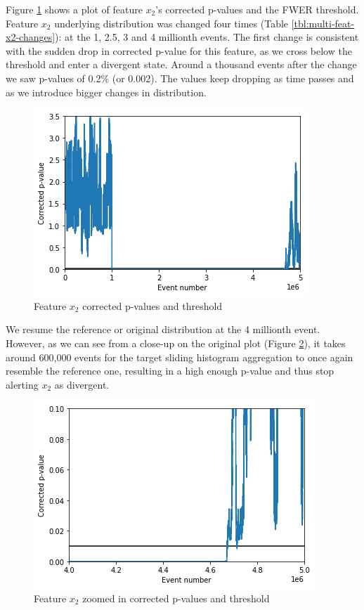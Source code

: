 \documentclass[sigconf]{acmart}
\begin{document}
Figure \ref{fig:x2-corrected-pvalues} shows a plot of feature $x_2$'s corrected p-values and the FWER threshold. Feature $x_2$ underlying distribution was changed four times (Table \ref{tbl:multi-feat-x2-changes}): at the 1, 2.5, 3 and 4 millionth events. The first change is consistent with the sudden drop in corrected p-value for this feature, as we cross below the threshold and enter a divergent state. Around a thousand events after the change we saw p-values of 0.2\% (or 0.002). The values keep dropping as time passes and as we introduce bigger changes in distribution.
\begin{figure}[!htb]
    \begin{center}
      \includegraphics[scale=0.5]{figures/x2-corrected-pvalues.png}
      \caption{Feature $x_2$ corrected p-values and threshold}
      \label{fig:x2-corrected-pvalues}
    \end{center}
\end{figure}
We resume the reference or original distribution at the 4 millionth event. However, as we can see from a close-up on the original plot (Figure \ref{fig:x2-corrected-pvalues-zoom}), it takes around 600,000 events for the target sliding histogram aggregation to once again resemble the reference one, resulting in a high enough p-value and thus stop alerting $x_2$ as divergent.
\begin{figure}[!htb]
    \begin{center}
      \includegraphics[scale=0.5]{figures/x2-corrected-pvalues-zoom2.png}
      \caption{Feature $x_2$ zoomed in corrected p-values and threshold}
      \label{fig:x2-corrected-pvalues-zoom}
    \end{center}
\end{figure}
\end{document}

